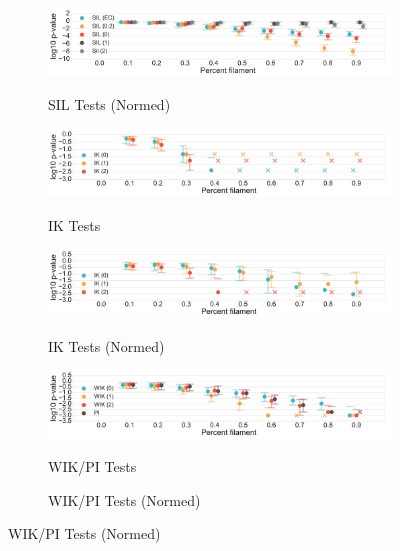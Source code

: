 \documentclass[12pt]{article}
\begin{document}
\begin{description}
\begin{center}
\begin{figure}[htp!]
      \begin{subfigure}{.45\textwidth}
        \centering
        \caption{SIL Tests (Normed)}
        \includegraphics[width=\linewidth]{figure_8_all_silhouette_group_normed.pdf}
        \label{fig:all_silh_normed_normed}
      \end{subfigure}
      \begin{subfigure}{.45\textwidth}
        \centering
        \caption{IK Tests}
        \includegraphics[width=\linewidth]{figure_8_all_contour_group.pdf}
        \label{fig:all_contour}
      \end{subfigure}
      \begin{subfigure}{.45\textwidth}
        \centering
        \caption{IK Tests (Normed)}
        \includegraphics[width=\linewidth]{figure_8_all_contour_group_normed.pdf}
        \label{fig:all_contour_normed}
      \end{subfigure}
      \begin{subfigure}{.45\textwidth}
        \centering
        \caption{WIK/PI Tests}
        \includegraphics[width=\linewidth]{figure_8_all_weighted_contour_group.pdf}
        \label{fig:all_weight}
      \end{subfigure}
      \begin{subfigure}{.45\textwidth}
        \centering
        \caption{WIK/PI Tests (Normed)}

\end{subfigure}
\end{figure}
\end{center}
\end{description}
\end{document}
